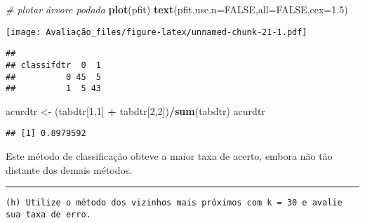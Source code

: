 \documentclass[]{article}
\newenvironment{Shaded}{\begin{snugshade}}{\end{snugshade}}
\newcommand{\KeywordTok}[1]{\textcolor[rgb]{0.13,0.29,0.53}{\textbf{#1}}}
\newcommand{\DataTypeTok}[1]{\textcolor[rgb]{0.13,0.29,0.53}{#1}}
\newcommand{\DecValTok}[1]{\textcolor[rgb]{0.00,0.00,0.81}{#1}}
\newcommand{\FloatTok}[1]{\textcolor[rgb]{0.00,0.00,0.81}{#1}}
\newcommand{\StringTok}[1]{\textcolor[rgb]{0.31,0.60,0.02}{#1}}
\newcommand{\CommentTok}[1]{\textcolor[rgb]{0.56,0.35,0.01}{\textit{#1}}}
\newcommand{\OtherTok}[1]{\textcolor[rgb]{0.56,0.35,0.01}{#1}}
\newcommand{\OperatorTok}[1]{\textcolor[rgb]{0.81,0.36,0.00}{\textbf{#1}}}
\newcommand{\NormalTok}[1]{#1}
\begin{document}
\begin{Shaded}
\begin{Highlighting}[]
\CommentTok{# plotar árvore podada}
\KeywordTok{plot}\NormalTok{(pfit)}
\KeywordTok{text}\NormalTok{(pfit,}\DataTypeTok{use.n=}\OtherTok{FALSE}\NormalTok{,}\DataTypeTok{all=}\OtherTok{FALSE}\NormalTok{,}\DataTypeTok{cex=}\FloatTok{1.5}\NormalTok{)}
\end{Highlighting}
\end{Shaded}

\texttt{[image: Avaliação\_files/figure-latex/unnamed-chunk-21-1.pdf]}

\begin{Shaded}
\end{Shaded}

\begin{verbatim}
##           
## classifdtr  0  1
##          0 45  5
##          1  5 43
\end{verbatim}

\begin{Shaded}
\begin{Highlighting}[]
\NormalTok{acurdtr <-}\StringTok{ }\NormalTok{(tabdtr[}\DecValTok{1}\NormalTok{,}\DecValTok{1}\NormalTok{] }\OperatorTok{+}\StringTok{ }\NormalTok{tabdtr[}\DecValTok{2}\NormalTok{,}\DecValTok{2}\NormalTok{])}\OperatorTok{/}\KeywordTok{sum}\NormalTok{(tabdtr)}
\NormalTok{acurdtr}
\end{Highlighting}
\end{Shaded}

\begin{verbatim}
## [1] 0.8979592
\end{verbatim}

Este método de classificação obteve a maior taxa de acerto, embora não
tão distante dos demais métodos.

\begin{center}\rule{0.5\linewidth}{\linethickness}\end{center}

\begin{verbatim}
(h) Utilize o método dos vizinhos mais próximos com k = 30 e avalie sua taxa de erro.
\end{verbatim}
\end{document}
